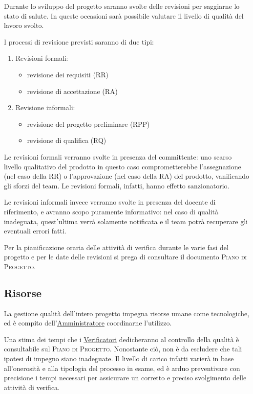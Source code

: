 \documentclass[11pt,a4paper]{article}
\begin{document}
Durante lo sviluppo del progetto saranno svolte delle revisioni per saggiarne lo stato di salute. In queste occasioni sarà possibile valutare il livello di qualità del lavoro svolto.

I processi di revisione previsti saranno di due tipi:
\begin{enumerate}
 	\item Revisioni formali:
	\begin{itemize}
		\item revisione dei requisiti (RR)
		\item revisione di accettazione (RA)
	\end{itemize}
 	\item Revisione informali:
	\begin{itemize}
		\item revisione del progetto preliminare (RPP)
		\item revisione di qualifica (RQ)
	\end{itemize}
\end{enumerate}
Le revisioni formali verranno svolte in presenza del committente: uno scarso livello qualitativo del prodotto in questo caso comprometterebbe l'assegnazione (nel caso della RR) o l'approvazione (nel caso della RA) del prodotto, vanificando gli sforzi del team. Le revisioni formali, infatti, hanno effetto sanzionatorio.

Le revisioni informali invece verranno svolte in presenza del docente di riferimento, e avranno scopo puramente informativo: nel caso di qualità ina\-deguata, quest'ultima verrà solamente notificata e il team potrà recuperare gli eventuali errori fatti.

Per la pianificazione oraria delle attività di verifica durante le varie fasi del progetto e per le date delle revisioni si prega di consultare il documento \textsc{Piano di Progetto}.
\subsection{Risorse}
La gestione qualità dell'intero progetto impegna risorse umane come tecnologiche, ed è compito dell'\underline{Amministratore} coordinarne l'utilizzo.

Una stima dei tempi che i \underline{Verificatori} dedicheranno al controllo della qualità è consultabile sul \textsc{Piano di Progetto}. Nonostante ciò, non è da escludere che tali ipotesi di impegno siano inadeguate. Il livello di carico infatti varierà in base all'onerosità e alla tipologia del processo in esame, ed è arduo preventivare con precisione i tempi necessari per assicurare un corretto e preciso svolgimento delle attività di verifica.
\end{document}
